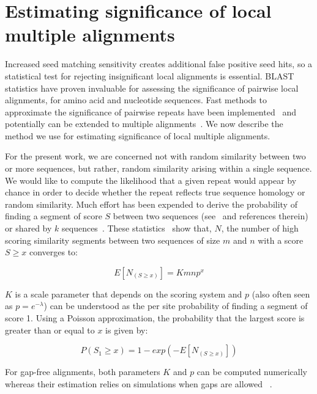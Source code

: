 \documentclass[10pt,journal,letterpaper,compsoc,peerreview]{IEEEtran}
\begin{document}
\section{Estimating significance of local multiple alignments}
Increased seed matching sensitivity creates additional
false positive seed hits, so a statistical test for rejecting
insignificant local alignments is essential.  BLAST statistics have proven
invaluable for assessing the significance of pairwise local alignments, for amino acid and nucleotide sequences.
Fast methods to approximate the significance of pairwise
repeats have been implemented~\cite{repseek} and potentially can be
extended to multiple alignments~\cite{ref-related1, Prakash2005}.  We
now describe the method we use for estimating significance of local
multiple alignments.

For the present work, we are concerned not with random similarity between two or more sequences, but rather, random similarity arising within a single sequence.  We would like to compute the likelihood that a given repeat would appear by chance in order to decide whether the repeat reflects true sequence homology or random similarity.  Much effort has been expended to derive the probability of finding a segment of score $S$ between two sequences (see~\cite{Ewens2001} and references therein) or shared by $k$ sequences~\cite{ref-related1}. These statistics~\cite{Karlin1990} show that, $N$, the number of high scoring similarity segments between two sequences of size $m$ and $n$ with a score $S \geq x$ converges to:

\begin{equation}
    E[ N_{(S\geq x)} ] = Kmn p^x
    \label{E_mn}
\end{equation}

$K$ is a scale parameter that depends on the scoring system and $p$ (also often seen as $p=e^{-\lambda}$) can be understood as the per site probability of finding a segment of score 1. Using a Poisson approximation, the probability that the largest score is greater than or equal to $x$ is given by:

\begin{equation}
    P( S_1 \geq x) = 1 - exp( -E[ N_{(S\geq x)} ] )
    \label{P_s1}
\end{equation}

For gap-free alignments, both parameters $K$ and $p$ can be computed numerically~\cite{Karlin1990} whereas their estimation relies on simulations when gaps are allowed  ~\cite{Waterman1994, Altschul2001}.
\end{document}
